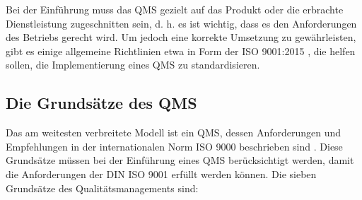 \documentclass[11pt]{scrartcl}       %
\begin{document}
Bei der Einführung muss das QMS gezielt auf das Produkt oder die erbrachte Dienstleistung zugeschnitten sein, d. h. es ist wichtig, dass es den Anforderungen des Betriebs gerecht wird. Um jedoch eine korrekte Umsetzung zu gewährleisten, gibt es einige allgemeine Richtlinien etwa in Form der ISO 9001:2015 \cite{normungsinstitut2009qualitatsmanagementsysteme}, die helfen sollen, die Implementierung eines QMS zu standardisieren. 

 

\subsection{Die Grundsätze des QMS}

Das am weitesten verbreitete Modell ist ein QMS, dessen Anforderungen
und Empfehlungen in der internationalen Norm ISO 9000 beschrieben sind \cite{sytko2017instrumentation}. Diese Grundsätze müssen bei der Einführung eines QMS berücksichtigt werden, damit die Anforderungen der DIN ISO 9001 erfüllt werden können. Die sieben Grundsätze des Qualitätsmanagements \cite{brugger2016din} sind:
\end{document}
